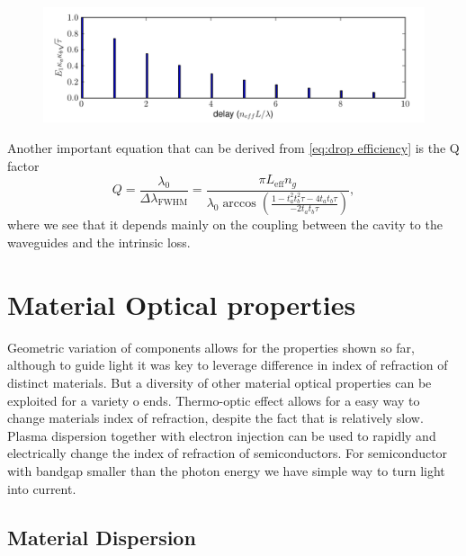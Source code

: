 \documentclass[12pt,twoside,english]{book}
\renewcommand{\~}{\perispomeni}%
\numberwithin{equation}{section}
\numberwithin{figure}{section}
\begin{document}
\begin{figure}
\centering \includegraphics{exp_decay}
\caption{\label{fig:exp decay}}
\end{figure}
Another important equation that can be derived from \ref{eq:drop efficiency} is the Q factor
\begin{equation}
Q=\frac{\lambda_{0}}{\Delta\lambda_{\text{FWHM}}}=\frac{\pi L_{\text{eff}}n_{g}}{\lambda_{0}\arccos\left(\frac{1-t_{a}^{2}t_{b}^{2}\tau-4t_{a}t_{b}\tau}{-2t_{a}t_{b}\tau}\right)},
\label{eq:Q}
\end{equation}
where we see that it depends mainly on the coupling between the cavity to the waveguides and the intrinsic loss.

\section{Material Optical properties}

Geometric variation of components allows for the properties shown so far, although to guide light it was key to leverage difference in index of refraction of distinct materials. But a diversity of other material optical properties can be exploited for a variety o ends. Thermo-optic effect allows for a easy way to change materials index of refraction, despite the fact that is relatively slow. Plasma dispersion together with electron injection can be used to rapidly and electrically change the index of refraction of semiconductors. For semiconductor with bandgap smaller than the photon energy we have simple way to turn light into current.

\subsection{Material Dispersion}
\end{document}
